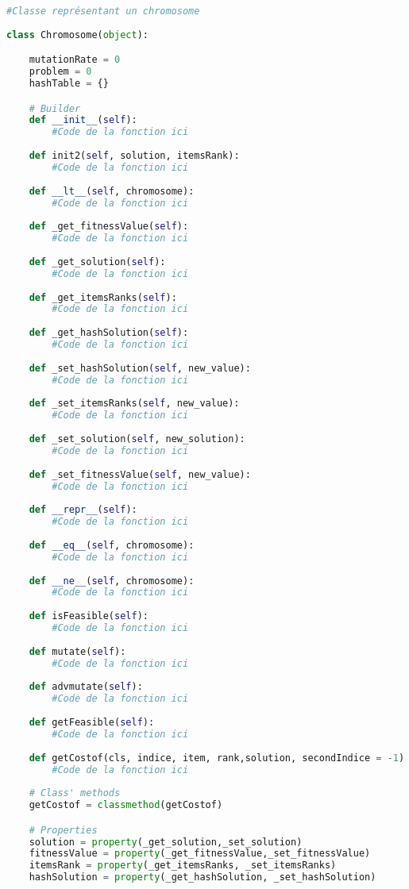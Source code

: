 	\begin{lstlisting}[language=python]
	#Classe représentant un chromosome	
	
class Chromosome(object):

	mutationRate = 0
	problem = 0
	hashTable = {}

	# Builder 
	def __init__(self):
		#Code de la fonction ici
	
	def init2(self, solution, itemsRank):
		#Code de la fonction ici
	
	def __lt__(self, chromosome):
		#Code de la fonction ici
	
	def _get_fitnessValue(self):
		#Code de la fonction ici
	
	def _get_solution(self):
		#Code de la fonction ici
	
	def _get_itemsRanks(self):
		#Code de la fonction ici
	
	def _get_hashSolution(self):
		#Code de la fonction ici
	
	def _set_hashSolution(self, new_value):
		#Code de la fonction ici
	
	def _set_itemsRanks(self, new_value):
		#Code de la fonction ici
	
	def _set_solution(self, new_solution):
		#Code de la fonction ici
	
	def _set_fitnessValue(self, new_value):
		#Code de la fonction ici
	
	def __repr__(self):
		#Code de la fonction ici
	
	def __eq__(self, chromosome):
		#Code de la fonction ici
	
	def __ne__(self, chromosome):
		#Code de la fonction ici
	
	def isFeasible(self):
		#Code de la fonction ici
	
	def mutate(self):
		#Code de la fonction ici
	
	def advmutate(self):
		#Code de la fonction ici
	
	def getFeasible(self):
		#Code de la fonction ici
	
	def getCostof(cls, indice, item, rank,solution, secondIndice = -1):
		#Code de la fonction ici
	
	# Class' methods
	getCostof = classmethod(getCostof)

	# Properties
	solution = property(_get_solution,_set_solution)
	fitnessValue = property(_get_fitnessValue,_set_fitnessValue)
	itemsRank = property(_get_itemsRanks, _set_itemsRanks)
	hashSolution = property(_get_hashSolution, _set_hashSolution) 

    \end{lstlisting}
    
